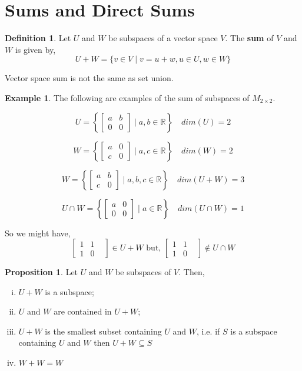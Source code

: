\documentclass{report}
\theoremstyle{definition}
\newtheorem*{_def}{Definition}
\newtheorem{_prop}[_thm]{Proposition}
\newtheorem{ex}{Example}[section]
\theoremstyle{remark}
\begin{document}
\section{Sums and Direct Sums}

\begin{_def}
Let $U$ and $W$ be subspaces of a vector space $V$.
The \textbf{sum} of $V$ and $W$ is given by,
\[U+W=\{v\in V \mid v=u+w, u\in U, w\in W\}\]
\end{_def}

Vector space sum is not the same as set union.

\begin{ex}
The following are examples of the sum of subspaces of $M_{2\times 2}$.

\[U=\left\lbrace
\begin{bmatrix}
a & b \\ 0 & 0
\end{bmatrix}
\mid
a, b\in \mathbb{R}
\right\rbrace
\quad
dim(U)=2
\]

\[W=\left\lbrace
\begin{bmatrix}
a & 0 \\ c & 0
\end{bmatrix}
\mid
a, c\in \mathbb{R}
\right\rbrace
\quad
dim(W)=2
\]

\[W=\left\lbrace
\begin{bmatrix}
a & b \\ c & 0
\end{bmatrix}
\mid
a, b, c\in \mathbb{R}
\right\rbrace
\quad
dim(U+W)=3
\]

\[U\cap W=\left\lbrace
\begin{bmatrix}
a & 0 \\ 0 & 0
\end{bmatrix}
\mid
a \in \mathbb{R}
\right\rbrace
\quad
dim(U\cap W)=1
\]

So we might have,
\[\begin{bmatrix}
1 & 1 & \\ 1 & 0
\end{bmatrix}
\in U+W
\text{ but, }
\begin{bmatrix}
1 & 1 & \\ 1 & 0
\end{bmatrix}
\notin U\cap W\]
\end{ex}

\begin{_prop}
Let $U$ and $W$ be subspaces of $V$.
Then,
\begin{enumerate}[i)]
 \item $U+W$ is a subspace; 
 \item $U$ and $W$ are contained in $U+W$;
 \item $U+W$ is the smallest subset containing $U$ and $W$, i.e. if $S$ is a subspace containing $U$ and $W$ then $U+W\subseteq S$ 
 \item $W+W=W$
\end{enumerate}
\end{_prop}
\end{document}
